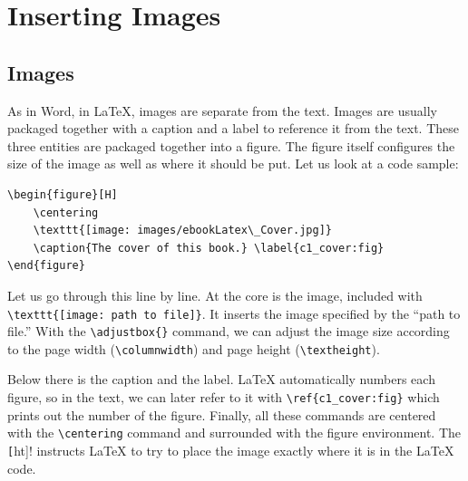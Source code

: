 \chapter{Inserting Images} \label{c2_secondchapter:cha}

\section{Images}\label{c1_images:sec}

As in Word, in \LaTeX{}, images are separate from the text. Images are usually packaged together with a caption and a label to reference it from the text. These three entities are packaged together into a figure. The figure itself configures the size of the image as well as where it should be put. Let us look at a code sample:
\begin{lstlisting}[language=Tex]
\begin{figure}[H]
    \centering
    \texttt{[image: images/ebookLatex\_Cover.jpg]}
    \caption{The cover of this book.} \label{c1_cover:fig}
\end{figure}
\end{lstlisting}

Let us go through this line by line. At the core is the image, included with \lstinline[language=Tex]!\texttt{[image: path to file]}!. It inserts the image specified by the ``path to file.'' With the \lstinline[language=Tex]!\adjustbox{}! command, we can adjust the image size according to the page width (\lstinline[language=Tex]!\columnwidth!) and page height (\lstinline[language=Tex]!\textheight!). 

Below there is the caption and the label. \LaTeX{} automatically numbers each figure, so in the text, we can later refer to it with \lstinline[language=Tex]!\ref{c1_cover:fig}! which prints out the number of the figure. Finally, all these commands are centered with the \lstinline[language=Tex]!\centering! command and surrounded with the figure environment. The \lstinline[language=Tex]![!ht]! instructs \LaTeX{} to try to place the image exactly where it is in the \LaTeX{} code.

